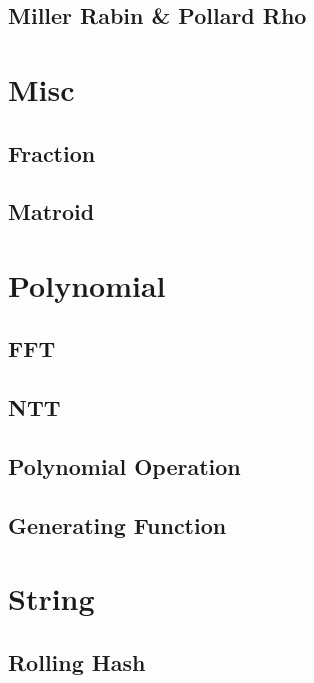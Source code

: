 \documentclass{article}
\begin{document}
\subsection{Miller Rabin \& Pollard Rho}


\section{Misc}

\subsection{Fraction}


\subsection{Matroid}


\section{Polynomial}

\subsection{FFT}


\subsection{NTT}


\subsection{Polynomial Operation}


\subsection{Generating Function}


\section{String}

\subsection{Rolling Hash}

\end{document}

